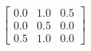 \documentclass[preview]{standalone}
\begin{document}
\begin{align*}
\left[ \begin{array}{ccc}0.0 & 1.0 & 0.5 \\ 0.0 & 0.5 & 0.0 \\ 0.5 & 1.0 & 0.0\end{array} \right]
\end{align*}
\end{document}
